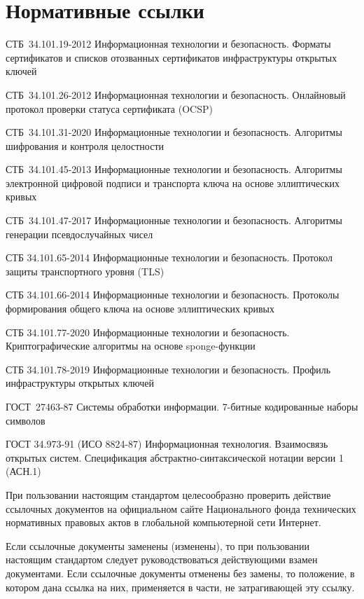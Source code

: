 \chapter{Нормативные ссылки}\label{REFS}

СТБ~34.101.19-2012 Информационная технологии и безопасность. Форматы 
сертификатов и списков отозванных сертификатов инфраструктуры открытых 
ключей

СТБ~34.101.26-2012 Информационная технологии и безопасность. Онлайновый 
протокол проверки статуса сертификата (OCSP)

СТБ~34.101.31-2020 Информационные технологии и безопасность. Алгоритмы 
шифрования и контроля целостности

СТБ~34.101.45-2013 Информационные технологии и безопасность. Алгоритмы  
электронной цифровой подписи и транспорта ключа на основе эллиптических 
кривых

СТБ~34.101.47-2017 Информационные технологии и безопасность. Алгоритмы 
генерации псевдослучайных чисел

СТБ 34.101.65-2014 Информационные технологии и безопасность. 
Протокол защиты транспортного уровня (TLS)

СТБ 34.101.66-2014 Информационные технологии и безопасность. 
Протоколы формирования общего ключа на основе эллиптических кривых

СТБ 34.101.77-2020 Информационные технологии и безопасность. 
Криптографические алгоритмы на основе sponge-функции

СТБ 34.101.78-2019 Информационные технологии и безопасность. 
Профиль инфраструктуры открытых ключей

ГОСТ~27463-87 Системы обработки информации. 7-битные кодированные наборы 
символов

ГОСТ 34.973-91 (ИСО 8824-87) Информационная технология. Взаимосвязь 
открытых систем. Спецификация абстрактно-синтаксической нотации версии 1 
(АСН.1) 

\begin{note*}
При пользовании настоящим стандартом целесообразно проверить действие
ссылочных документов на официальном сайте Национального фонда
технических нормативных правовых актов в глобальной компьютерной сети Интернет.

Если ссылочные документы заменены (изменены), то при пользовании настоящим
стандартом следует руководствоваться действующими взамен документами. Если
ссылочные документы отменены без замены, то положение, в котором дана ссылка на
них, применяется в части, не затрагивающей эту ссылку.
\end{note*}


